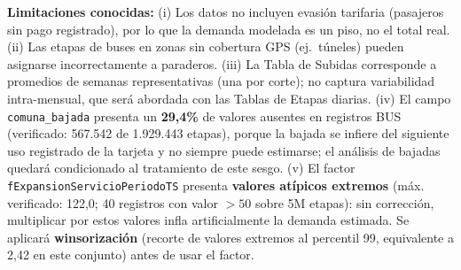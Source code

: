 \documentclass[11pt,letterpaper]{article}
\begin{document}
\noindent\textbf{Limitaciones conocidas:} (i) Los datos no incluyen evasión tarifaria (pasajeros sin pago registrado), por lo que la demanda modelada es un piso, no el total real. (ii) Las etapas de buses en zonas sin cobertura GPS (ej.\ túneles) pueden asignarse incorrectamente a paraderos. (iii) La Tabla de Subidas corresponde a promedios de semanas representativas (una por corte); no captura variabilidad intra-mensual, que será abordada con las Tablas de Etapas diarias. (iv) El campo \texttt{comuna\_bajada} presenta un \textbf{29{,}4\%} de valores ausentes en registros BUS (verificado: 567.542 de 1.929.443 etapas), porque la bajada se infiere del siguiente uso registrado de la tarjeta y no siempre puede estimarse; el análisis de bajadas quedará condicionado al tratamiento de este sesgo. (v) El factor \texttt{fExpansionServicioPeriodoTS} presenta \textbf{valores atípicos extremos} (máx. verificado: 122{,}0; 40 registros con valor $>50$ sobre 5M etapas): sin corrección, multiplicar por estos valores infla artificialmente la demanda estimada. Se aplicará \textbf{winsorización} (recorte de valores extremos al percentil 99, equivalente a 2{,}42 en este conjunto) antes de usar el factor.
\end{document}
